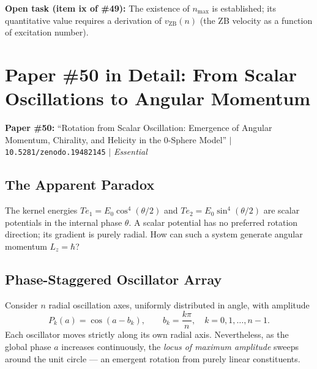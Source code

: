 \documentclass[12pt,letterpaper]{article}
\newcommand{\doilink}[1]{\texttt{#1}}
\newcommand{\paperno}[1]{\textbf{\#{}#1}}
\newcommand{\vZB}{v_{\mathrm{ZB}}}
\begin{document}
\begin{mdframed}[style=openbox]
\textbf{Open task (item ix of \paperno{49}):}
The existence of $n_{\max}$ is established; its quantitative value requires a derivation
of $\vZB(n)$ (the ZB velocity as a function of excitation number).
\end{mdframed}

\clearpage

\section{\texorpdfstring{Paper \#50 in Detail: From Scalar Oscillations to Angular Momentum}{Paper \#50 in Detail: From Scalar Oscillations to Angular Momentum}}
\label{sec:p50}

\begin{mdframed}[style=greenbox]
\textbf{\textcolor{threadgreen}{Paper \#50:}}
``Rotation from Scalar Oscillation: Emergence of Angular Momentum, Chirality, and Helicity
in the 0-Sphere Model'' $|$ \doilink{10.5281/zenodo.19482145} $|$ \textit{Essential}
\end{mdframed}

\subsection{The Apparent Paradox}

The kernel energies $Te_1 = E_0\cos^4(\theta/2)$ and $Te_2 = E_0\sin^4(\theta/2)$
are scalar potentials in the internal phase $\theta$. A scalar potential has no preferred
rotation direction; its gradient is purely radial. How can such a system generate
angular momentum $L_z = \hbar$?

\subsection{Phase-Staggered Oscillator Array}

Consider $n$ radial oscillation axes, uniformly distributed in angle, with amplitude
\begin{equation}
P_k(a) = \cos(a - b_k), \qquad b_k = \frac{k\pi}{n}, \quad k=0,1,\ldots,n-1.
\end{equation}
Each oscillator moves strictly along its own radial axis. Nevertheless, as the global
phase $a$ increases continuously, the \emph{locus of maximum amplitude} sweeps around
the unit circle --- an emergent rotation from purely linear constituents.
\end{document}
